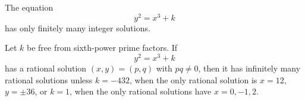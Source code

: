\begin{proposition}
    The equation
\[
    y^2=x^3+k
\]
    has only finitely many integer solutions.
\end{proposition}

\begin{proposition}
    Let $k$ be free from sixth-power prime factors. If
\[
    y^2=x^3+k
\]
    has a rational solution $(x,y)=(p,q)$ with $pq\ne0$, then it has infinitely many rational solutions unless $k=-432$, when the only rational solution is $x=12$, $y=\pm36$, or $k=1$, when the only rational solutions have $x=0,-1,2$.
\end{proposition}
